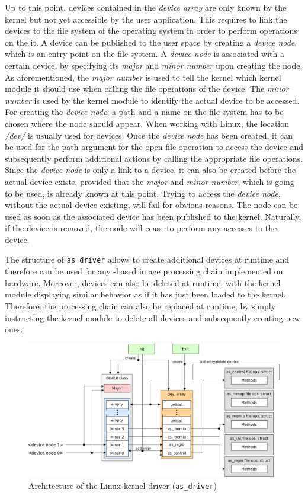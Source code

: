 Up to this point, devices contained in the \textit{device array} are only known by the kernel but not yet accessible by the user application.
This requires to link the devices to the file system of the operating system in order to perform operations on the it.
A device can be published to the user space by creating a \textit{device node}, which is an entry point on the file system.
A \textit{device node} is associated with a certain device, by specifying its \textit{major} and \textit{minor number} upon creating the node.
As aforementioned, the \textit{major number} is used to tell the kernel which kernel module it should use when calling the file operations of the device.
The \textit{minor number} is used by the kernel module to identify the actual device to be accessed.
For creating the \textit{device node}, a path and a name on the file system has to be chosen where the node should appear.
When working with Linux, the location \textit{/dev/} is usually used for devices.
Once the \textit{device node} has been created, it can be used for the path argument for the open file operation to access the device and subsequently perform additional actions by calling the appropriate file operations.
Since the \textit{device node} is only a link to a device, it can also be created before the actual device exists, provided that the \textit{major} and \textit{minor number}, which is going to be used, is already known at this point.
Trying to access the \textit{device node}, without the actual device existing, will fail for obvious reasons.
The node can be used as soon as the associated device has been published to the kernel.
Naturally, if the device is removed, the node will cease to perform any accesses to the device.

The structure of \texttt{as\_driver} allows to create additional devices at runtime and therefore can be used for any \asterics-based image processing chain implemented on hardware.
Moreover, devices can also be deleted at runtime, with the kernel module displaying similar behavior as if it has just been loaded to the kernel.
Therefore, the processing chain can also be replaced at runtime, by simply instructing the kernel module to delete all devices and subsequently creating new ones.

\begin{figure}[ht]
    \centering
    \includegraphics[width=0.8\linewidth,clip]{figs/driver_architecture.png}
    \caption{Architecture of the \asterics Linux kernel driver (\texttt{as\_driver})}
    \label{fig:driver-architecture}
\end{figure}

